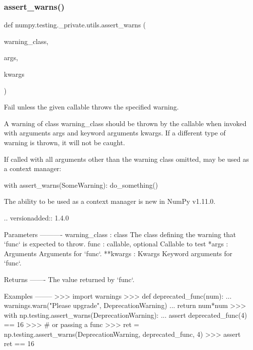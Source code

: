 \subsubsection{\texorpdfstring{assert\+\_\+warns()}{assert\_warns()}}
{\footnotesize\ttfamily def numpy.\+testing.\+\_\+private.\+utils.\+assert\+\_\+warns (\begin{DoxyParamCaption}\item[{}]{warning\+\_\+class,  }\item[{}]{args,  }\item[{}]{kwargs }\end{DoxyParamCaption})}

\begin{DoxyVerb}Fail unless the given callable throws the specified warning.

A warning of class warning_class should be thrown by the callable when
invoked with arguments args and keyword arguments kwargs.
If a different type of warning is thrown, it will not be caught.

If called with all arguments other than the warning class omitted, may be
used as a context manager:

    with assert_warns(SomeWarning):
        do_something()

The ability to be used as a context manager is new in NumPy v1.11.0.

.. versionadded:: 1.4.0

Parameters
----------
warning_class : class
    The class defining the warning that `func` is expected to throw.
func : callable, optional
    Callable to test
*args : Arguments
    Arguments for `func`.
**kwargs : Kwargs
    Keyword arguments for `func`.

Returns
-------
The value returned by `func`.

Examples
--------
>>> import warnings
>>> def deprecated_func(num):
...     warnings.warn("Please upgrade", DeprecationWarning)
...     return num*num
>>> with np.testing.assert_warns(DeprecationWarning):
...     assert deprecated_func(4) == 16
>>> # or passing a func
>>> ret = np.testing.assert_warns(DeprecationWarning, deprecated_func, 4)
>>> assert ret == 16
\end{DoxyVerb}
 \mbox{\label{namespacenumpy_1_1testing_1_1__private_1_1utils_acffb1a5389e1d7e84e257af6b81590ff}} 
